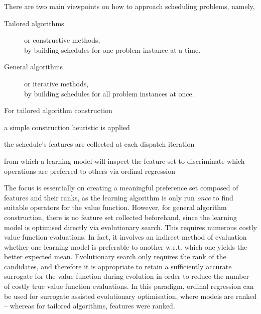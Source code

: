 \noindent There are two main viewpoints on how to approach scheduling problems, 
namely,
\begin{description}
  \item[Tailored algorithms] or constructive methods, \\
  by building schedules for one problem instance at a time.
  \item[General algorithms] or iterative methods, \\ 
  by building schedules for all problem instances at once.
\end{description}
For tailored algorithm construction
\begin{enumerate*} %
  \item a simple construction heuristic is applied 
  \item the schedule's features are collected at each dispatch iteration
  \item from which a learning model will inspect the feature set to 
  discriminate which operations are preferred to others via ordinal regression 
\end{enumerate*}
The focus is essentially on creating a meaningful preference set composed of 
features and their ranks, as the learning algorithm is only run \emph{once} to 
find suitable operators for the value function. 
However, for general algorithm construction, there is no feature set collected 
beforehand, since the learning model is optimised directly via evolutionary 
search. This requires numerous costly value function evaluations. 
In fact, it involves an indirect method of evaluation whether one learning 
model is preferable to another w.r.t. which one yields the better expected 
mean. 
Evolutionary search only requires the rank of the candidates, and therefore it 
is appropriate to retain a sufficiently accurate surrogate for the value 
function during evolution in order to reduce the number of costly true value 
function evaluations. 
In this paradigm, ordinal regression can be used for surrogate assisted 
evolutionary optimisation, where models are ranked -- whereas for tailored 
algorithms, features were ranked. 

